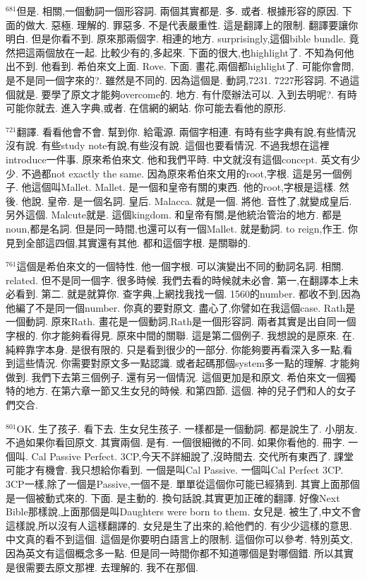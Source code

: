 \documentclass{book}
\begin{document}
$^{681}$但是.
相關,一個動詞一個形容詞.
兩個其實都是.
多.
或者.
根據形容的原因.
下面的做大.
惡極.
理解的.
罪惡多.
不是代表嚴重性.
這是翻譯上的限制.
翻譯要讓你明白.
但是你看不到.
原來那兩個字.
相連的地方.
surprisingly,這個bible bundle.
竟然把這兩個放在一起.
比較少有的,多起來.
下面的很大,也highlight了.
不知為何他出不到.
他看到.
希伯來文上面.
Rove.
下面.
畫花,兩個都highlight了.
可能你會問,是不是同一個字來的?.
雖然是不同的.
因為這個是.
動詞,7231.
7227形容詞.
不過這個就是.
要學了原文才能夠overcome的.
地方.
有什麼辦法可以.
入到去明呢?.
有時可能你就去.
進入字典,或者.
在信網的網站.
你可能去看他的原形.

$^{721}$翻譯.
看看他會不會.
幫到你.
給電源.
兩個字相連.
有時有些字典有說,有些情況沒有說.
有些study note有說,有些沒有說.
這個也要看情況.
不過我想在這裡introduce一件事.
原來希伯來文.
他和我們平時.
中文就沒有這個concept.
英文有少少.
不過都not exactly the same.
因為原來希伯來文用的root,字根.
這是另一個例子.
他這個叫Mallet.
Mallet.
是一個和皇帝有關的東西.
他的root,字根是這樣.
然後.
他說.
皇帝.
是一個名詞.
皇后.
Malacca.
就是一個.
將他.
音性了,就變成皇后.
另外這個.
Malcute就是.
這個kingdom.
和皇帝有關,是他統治管治的地方.
都是noun,都是名詞.
但是同一時間,也還可以有一個Mallet.
就是動詞.
to reign,作王.
你見到全部這四個,其實還有其他.
都和這個字根.
是關聯的.

$^{761}$這個是希伯來文的一個特性.
他一個字根.
可以演變出不同的動詞名詞.
相關.
related.
但不是同一個字.
很多時候.
我們去看的時候就未必會.
第一,在翻譯本上未必看到.
第二.
就是就算你.
查字典,上網找我找一個.
1560的number.
都收不到,因為他編了不是同一個number.
你真的要對原文.
盡心了,你譬如在我這個case.
Rath是一個動詞.
原來Rath.
畫花是一個動詞,Rath是一個形容詞.
兩者其實是出自同一個字根的.
你才能夠看得見.
原來中間的關聯.
這是第二個例子.
我想說的是原來.
在.
純粹靠字本身.
是很有限的.
只是看到很少的一部分.
你能夠要再看深入多一點,看到這些情況.
你需要對原文多一點認識.
或者起碼那個system多一點的理解.
才能夠做到.
我們下去第三個例子.
還有另一個情況.
這個更加是和原文.
希伯來文一個獨特的地方.
在第六章一節又生女兒的時候.
和第四節.
這個.
神的兒子們和人的女子們交合.

$^{801}$OK.
生了孩子.
看下去.
生女兒生孩子.
一樣都是一個動詞.
都是說生了.
小朋友.
不過如果你看回原文.
其實兩個.
是有.
一個很細微的不同.
如果你看他的.
冊字.
一個叫.
Cal Passive Perfect.
3CP,今天不詳細說了,沒時間去.
交代所有東西了.
課堂可能才有機會.
我只想給你看到.
一個是叫Cal Passive.
一個叫Cal Perfect 3CP.
3CP一樣,除了一個是Passive,一個不是.
單單從這個你可能已經猜到.
其實上面那個是一個被動式來的.
下面.
是主動的.
換句話說,其實更加正確的翻譯.
好像Next Bible那樣說,上面那個是叫Daughters were born to them.
女兒是.
被生了,中文不會這樣說,所以沒有人這樣翻譯的.
女兒是生了出來的,給他們的.
有少少這樣的意思.
中文真的看不到這個.
這個是你要明白語言上的限制.
這個你可以參考.
特別英文,因為英文有這個概念多一點.
但是同一時間你都不知道哪個是對哪個錯.
所以其實是很需要去原文那裡.
去理解的.
我不在那個.
\end{document}
